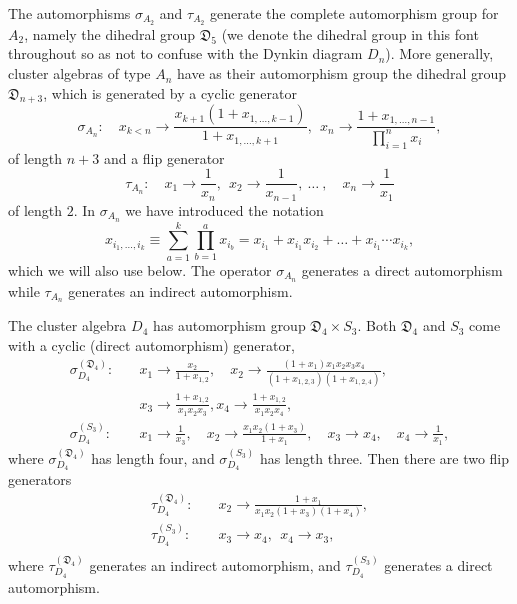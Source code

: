 \documentclass[12pt]{article}
\begin{document}
The automorphisms $\sigma_{A_2}$ and $\tau_{A_2}$ generate the complete automorphism group for $A_2$, namely the dihedral group ${\mathfrak D}_5$ (we denote the dihedral group in this font throughout so as not to confuse with the Dynkin diagram $D_n$). More generally, cluster algebras of type $A_n$ have as their automorphism group the dihedral group ${\mathfrak D}_{n+3}$, which is generated by a cyclic generator
\begin{equation} \label{eq:def_An_automorphic_cycle}
  \sigma_{A_n}:\quad x_{k<n} \to \frac{x_{k+1}(1+x_{1,\ldots,k-1})}{1+x_{1,\ldots,k+1}},~~x_n\to\frac{1+x_{1,\ldots,n-1}}{\prod_{i=1}^n x_i} ,
\end{equation}
of length $n+3$ and a flip generator 
\begin{equation} \label{eq:def_An_automorphic_flip}
  \tau_{A_n}: \quad x_1 \to \frac{1}{x_n},~~x_2 \to \frac{1}{x_{n-1}},~\ldots~, \quad x_n\to\frac{1}{x_1}
\end{equation}
of length $2$. In $\sigma_{A_n}$ we have introduced the notation
\begin{equation} \label{eq:compound_x_def}
	x_{i_1,\ldots, i_k} \equiv \sum_{a=1}^k \prod_{b=1}^a x_{i_b} = x_{i_1}+x_{i_1}x_{i_2} + \ldots + x_{i_1}\cdots x_{i_k},
\end{equation}
which we will also use below. The operator $\sigma_{A_n}$ generates a direct automorphism while $\tau_{A_n}$ generates an indirect automorphism.

The cluster algebra $D_4$ has automorphism group ${\mathfrak D}_4\times S_3$. Both ${\mathfrak D}_4$ and $S_3$ come with a cyclic (direct automorphism) generator,
\vspace{.1cm}
\begin{align}
  \sigma^{({\mathfrak D}_4)}_{D_4}:\quad
    &x_1\to\frac{x_2}{1+x_{1,2}}, \quad
    x_2\to\frac{\left(1+x_1\right)x_1 x_2 x_3 x_4}{\left(1+x_{1,2,3}\right) \left(1+x_{1,2,4}\right)},  \nonumber \\
    &x_3\to\frac{1+x_{1,2}}{x_1 x_2 x_3},
    x_4\to\frac{1+x_{1,2}}{x_1 x_2 x_4}, \\[2ex]
  \sigma^{(S_3)}_{D_4}:\quad& 
    x_1\to \frac{1}{x_3}, \quad
    x_2\to \frac{x_1 x_2 \left(1+x_3\right)}{1+x_1}, \quad
    x_3\to x_4, \quad
    x_4\to \frac{1}{x_1} , \nonumber
\end{align}
where $\sigma^{({\mathfrak D}_4)}_{D_4}$ has length four, and $\sigma^{(S_3)}_{D_4}$ has length three. Then there are two flip generators
\vspace{.1cm}
\begin{equation}
\begin{split}
  \tau^{({\mathfrak D}_4)}_{D_4}:\quad& 
    x_2\to \frac{1+x_1}{x_1 x_2 \left(1+x_3\right) \left(1+x_4\right)}, \\[2ex]
  \tau^{(S_3)}_{D_4}:\quad& 
    x_3\to x_4,~~
    x_4\to x_3 , \\[1ex]
\end{split}  
\end{equation}
where $\tau^{({\mathfrak D}_4)}_{D_4}$ generates an indirect automorphism, and $\tau^{(S_3)}_{D_4}$ generates a direct automorphism.
\end{document}
